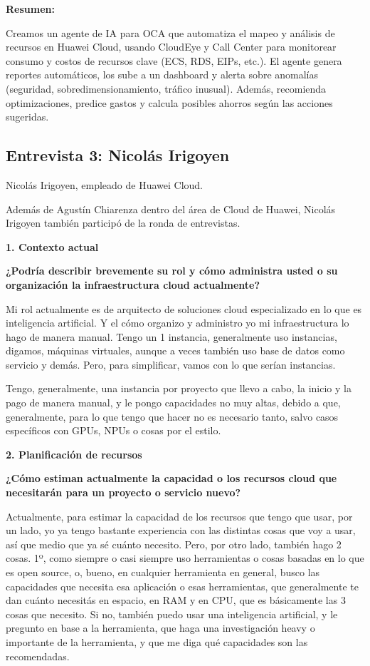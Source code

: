 \textbf{Resumen:}

Creamos un agente de IA para OCA que automatiza el mapeo y análisis de recursos en Huawei Cloud, usando CloudEye y Call Center para monitorear consumo y costos de recursos clave (ECS, RDS, EIPs, etc.). El agente genera reportes automáticos, los sube a un dashboard y alerta sobre anomalías (seguridad, sobredimensionamiento, tráfico inusual). Además, recomienda optimizaciones, predice gastos y calcula posibles ahorros según las acciones sugeridas.

\subsection{Entrevista 3: Nicolás Irigoyen}

Nicolás Irigoyen, empleado de Huawei Cloud.

Además de Agustín Chiarenza dentro del área de Cloud de Huawei, Nicolás Irigoyen también participó de la ronda de entrevistas.

\textbf{1. Contexto actual}

\textbf{¿Podría describir brevemente su rol y cómo administra usted o su organización la infraestructura cloud actualmente?}

Mi rol actualmente es de arquitecto de soluciones cloud especializado en lo que es inteligencia artificial. Y el cómo organizo y administro yo mi infraestructura lo hago de manera manual. Tengo un 1 instancia, generalmente uso instancias, digamos, máquinas virtuales, aunque a veces también uso base de datos como servicio y demás. Pero, para simplificar, vamos con lo que serían instancias.

Tengo, generalmente, una instancia por proyecto que llevo a cabo, la inicio y la pago de manera manual, y le pongo capacidades no muy altas, debido a que, generalmente, para lo que tengo que hacer no es necesario tanto, salvo casos específicos con GPUs, NPUs o cosas por el estilo.

\textbf{2. Planificación de recursos}

\textbf{¿Cómo estiman actualmente la capacidad o los recursos cloud que necesitarán para un proyecto o servicio nuevo?}

Actualmente, para estimar la capacidad de los recursos que tengo que usar, por un lado, yo ya tengo bastante experiencia con las distintas cosas que voy a usar, así que medio que ya sé cuánto necesito. Pero, por otro lado, también hago 2 cosas. 1º, como siempre o casi siempre uso herramientas o cosas basadas en lo que es open source, o, bueno, en cualquier herramienta en general, busco las capacidades que necesita esa aplicación o esas herramientas, que generalmente te dan cuánto necesitás en espacio, en RAM y en CPU, que es básicamente las 3 cosas que necesito. Si no, también puedo usar una inteligencia artificial, y le pregunto en base a la herramienta, que haga una investigación heavy o importante de la herramienta, y que me diga qué capacidades son las recomendadas.

